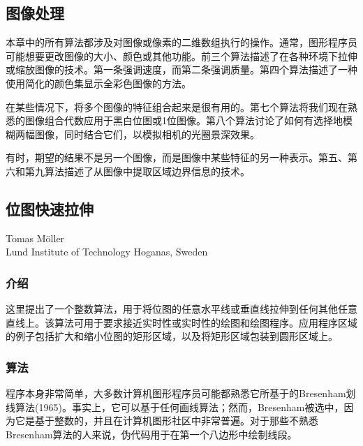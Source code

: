 \begin{CJK}{UTF8}{gkai}
\chapter{图像处理}
\end{CJK}


\begin{CJK}{UTF8}{gbsn}


本章中的所有算法都涉及对图像或像素的二维数组执行的操作。通常，图形程序员可能想要更改图像的大小、颜色或其他功能。前三个算法描述了在各种环境下拉伸或缩放图像的技术。第一条强调速度，而第二条强调质量。第四个算法描述了一种使用简化的颜色集显示全彩色图像的方法。


在某些情况下，将多个图像的特征组合起来是很有用的。第七个算法将我们现在熟悉的图像组合代数应用于黑白位图或1位图像。第八个算法讨论了如何有选择地模糊两幅图像，同时结合它们，以模拟相机的光圈景深效果。


有时，期望的结果不是另一个图像，而是图像中某些特征的另一种表示。第五、第六和第九算法描述了从图像中提取区域边界信息的技术。


\newpage
\section{位图快速拉伸}
\begin{center}
\small{
Tomas M\"oller\\
Lund Institute of Technology 
Hoganas, Sweden}
\end{center}

\subsection*{介绍}

这里提出了一个整数算法，用于将位图的任意水平线或垂直线拉伸到任何其他任意直线上。该算法可用于要求接近实时性或实时性的绘图和绘图程序。应用程序区域的例子包括扩大和缩小位图的矩形区域，以及将矩形区域包装到圆形区域上。
\subsection*{算法}
程序本身非常简单，大多数计算机图形程序员可能都熟悉它所基于的Bresenham划线算法(1965)。事实上，它可以基于任何画线算法；然而，Bresenham被选中，因为它是基于整数的，并且在计算机图形社区中非常普遍。对于那些不熟悉Bresenham算法的人来说，伪代码用于在第一个八边形中绘制线段。

\IncMargin{1em}
\begin{algorithm} 


\end{algorithm}
\end{CJK}
